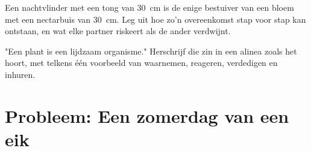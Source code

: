 \begin{exercise}[$\star\star\star$]\label{exo:g12:plant-rooted-life:14}
Een nachtvlinder met een tong van \qty{30}{cm} is de enige bestuiver van
een bloem met een nectarbuis van \qty{30}{cm}. Leg uit hoe zo'n
overeenkomst stap voor stap kan ontstaan, en wat elke partner riskeert
als de ander verdwijnt.
\end{exercise}

\begin{exercise}[$\star\star\star$]\label{exo:g12:plant-rooted-life:15}
"Een plant is een lijdzaam organisme." Herschrijf die zin in een alinea
zoals het hoort, met telkens één voorbeeld van waarnemen, reageren,
verdedigen en inhuren.
\end{exercise}

\section{Probleem: Een zomerdag van een eik}

